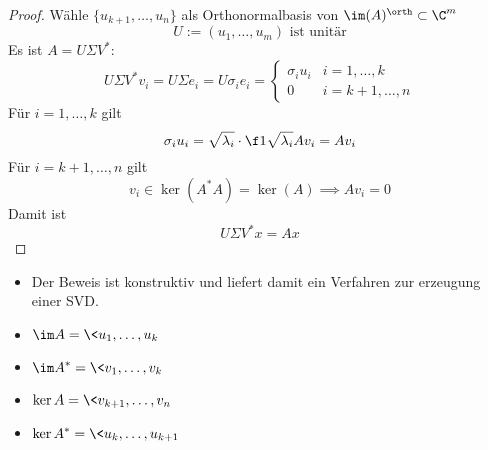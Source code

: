 \documentclass[a4paper,11pt]{scrartcl}
\begin{document}
\begin{st}
\begin{proof}
		Wähle $\{u_{k+1},\dotsc, u_n\}$ als Orthonormalbasis von $\im( A)^\orth \subset \C^m$ 
		\[
			U := (u_1,\dotsc, u_m) \text{ ist unitär}
		\]
		Es ist $A=U\Sigma V^*$:
		\[
			U\Sigma V^* v_i = U \Sigma e_i = U \sigma_i e_i = \begin{cases}
				\sigma_i u_i & i=1,\dotsc,k \\
				0 & i =k+1,\dotsc,n
			\end{cases}
		\]
		Für $i=1,\dotsc,k$ gilt
		\[
			\sigma_i u_i = \sqrt{\lambda_i} \cdot \f 1{\sqrt{\lambda_i}}Av_i = Av_i
		\]
		Für $i=k+1,\dotsc, n$ gilt
		\[
			v_i \in \ker (A^*A) = \ker (A) \implies Av_i = 0
		\]
		Damit ist
		\[
			U\Sigma V^* x = Ax
		\]
	\end{proof}
	\begin{note}
		\begin{itemize}
			\item
				Der Beweis ist konstruktiv und liefert damit ein Verfahren zur erzeugung einer SVD.
			\item
				$\displaystyle \im A = \<u_1,\dotsc,u_k\>$
			\item
				$\displaystyle \im A^* = \<v_1,\dotsc, v_k\>$
			\item
				$\displaystyle \ker A = \<v_{k+1},\dotsc, v_n\>$
			\item
				$\displaystyle \ker A^* = \<u_k,\dotsc, u_{k+1}\>$
		\end{itemize}
	\end{note}
\end{st}
\end{document}

